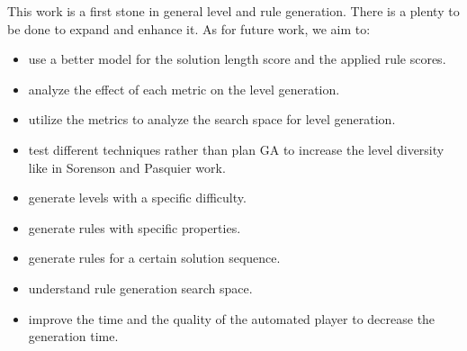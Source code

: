 This work is a first stone in general level and rule generation. There is a plenty to be done to expand and enhance it. As for future work, we aim to:
\begin{itemize} \itemsep0pt \parskip0pt 
	\item use a better model for the solution length score and the applied rule scores.
	\item analyze the effect of each metric on the level generation.
	\item utilize the metrics to analyze the search space for level generation.
	\item test different techniques rather than plan GA to increase the level diversity like in Sorenson and Pasquier work\cite{genericLevelFramework}.
	\item generate levels with a specific difficulty.
	\item generate rules with specific properties.
	\item generate rules for a certain solution sequence.
	\item understand rule generation search space.
	\item improve the time and the quality of the automated player to decrease the generation time.
\end{itemize}